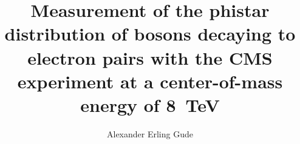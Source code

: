 \phd %

\title{
    \textbf{
        Measurement of the phistar distribution of \Z bosons decaying to
        electron pairs with the CMS experiment at a center-of-mass energy of
        \SI{8}{\TeV}
    }
}
\author{Alexander Erling Gude}


\abstract{}
\copyrightpage
\acknowledgements{}
\dedication{}

\beforepreface

\figurespage
\tablespage

\afterpreface
